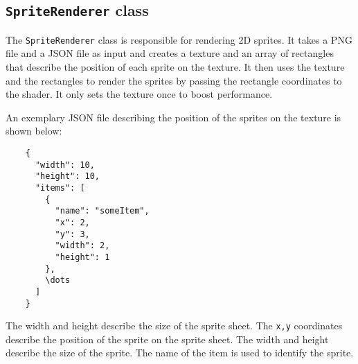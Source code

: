 \subsection{\texttt{SpriteRenderer} class} \label{sprite_renderer}
The \texttt{SpriteRenderer} class is responsible for rendering 2D sprites.
It takes a PNG file and a JSON file as input and creates a texture and an array of rectangles that describe the position of each sprite on the texture.
It then uses the texture and the rectangles to render the sprites by passing the rectangle coordinates to the shader.
It only sets the texture once to boost performance.

An exemplary JSON file describing the position of the sprites on the texture is shown below:

\begin{verbatim}
    {
      "width": 10,
      "height": 10,
      "items": [
        {
          "name": "someItem",
          "x": 2,
          "y": 3,
          "width": 2,
          "height": 1
        },
        \dots
      ]
    }
\end{verbatim}


The width and height describe the size of the sprite sheet.
The \texttt{x,y} coordinates describe the position of the sprite on the sprite sheet.
The width and height describe the size of the sprite.
The name of the item is used to identify the sprite.

